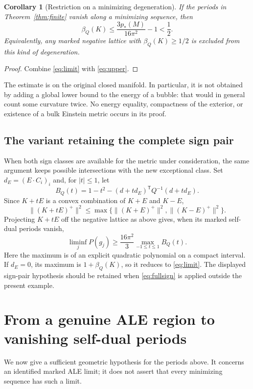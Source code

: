 \documentclass[11pt,a4paper]{article}
\newtheorem{corollary}[theorem]{Corollary}
\theoremstyle{definition}
\theoremstyle{remark}
\begin{document}
\begin{corollary}[Restriction on a minimizing degeneration]\label{cor:budget}
If the periods in Theorem~\ref{thm:finite} vanish along a minimizing
sequence, then
\begin{equation}\label{eq:budget}
 \boxed{\beta_Q(K)\le\frac{3p_*(M)}{16\pi^2}-1<\frac12.}
\end{equation}
Equivalently, any marked negative lattice with $\beta_Q(K)\ge1/2$
is excluded from this kind of degeneration.
\end{corollary}
\begin{proof}
Combine \eqref{eq:limit} with \eqref{eq:upper}.
\end{proof}

The estimate is on the original closed manifold. In particular, it is
not obtained by adding a global lower bound to the energy of a bubble:
that would in general count some curvature twice. No energy equality,
compactness of the exterior, or existence of a bulk Einstein metric
occurs in its proof.

\subsection{The variant retaining the complete sign pair}
When both sign classes are available for the metric under consideration,
the same argument keeps possible intersections with the new exceptional
class. Set $d_E=(E\cdot C_i)_i$ and, for $|t|\le1$, let
\[
 B_Q(t)=1-t^2-(d+td_E)^{\mathsf T}Q^{-1}(d+td_E).
\]
Since $K+tE$ is a convex combination of $K+E$ and $K-E$,
\[
 \|(K+tE)^+\|^2\le
 \max\{\|(K+E)^+\|^2,\|(K-E)^+\|^2\}.
\]
Projecting $K+tE$ off the negative lattice as above gives, when its
marked self-dual periods vanish,
\begin{equation}\label{eq:fullsign}
 \liminf_jP(g_j)\ge
 \frac{16\pi^2}{3}\max_{-1\le t\le1}B_Q(t).
\end{equation}
Here the maximum is of an explicit quadratic polynomial on a compact
interval. If $d_E=0$, its maximum is $1+\beta_Q(K)$, so it reduces to
\eqref{eq:limit}. The displayed sign-pair hypothesis should be retained
when \eqref{eq:fullsign} is applied outside the present example.

\section{From a genuine ALE region to vanishing self-dual periods}
We now give a sufficient geometric hypothesis for the periods above.
It concerns an identified marked ALE limit; it does not assert that every
minimizing sequence has such a limit.
\end{document}
